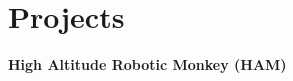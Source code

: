 \section{Projects}

    \begin{twocolentry}{}
    	\textbf{High Altitude Robotic Monkey (HAM)}
	\end{twocolentry}

